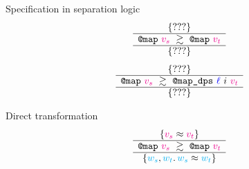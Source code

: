 \begin{frame}{Specification in separation logic}
\LARGE
\[
    \iSimvHoarePretty{
        ???
    }{
        \datalangCall{\datalangFnptr{\texttt{map}}}{\mathcolor{magenta}{\datalangVal_s}}
    }{
        \datalangCall{\datalangFnptr{\texttt{map}}}{\mathcolor{magenta}{\datalangVal_t}}
    }{
        ???
    }
\]
\vfill
\[
    \iSimvHoarePretty{
        ???
    }{
        \datalangCall{\datalangFnptr{\texttt{map}}}{\mathcolor{magenta}{\datalangVal_s}}
    }{
        \datalangCall{\datalangFnptr{\texttt{map\_dps}}}{\mathcolor{blue}{\datalangLoc}\ \datalangIdx\ \mathcolor{magenta}{\datalangVal_t}}
    }{
        ???
    }
\]
\end{frame}

\begin{frame}{Direct transformation}
\Large
\[
    \iSimvHoarePretty{
        \mathcolor{magenta}{\datalangVal_s} \iSimilar \mathcolor{magenta}{\datalangVal_t}
    }{
        \datalangCall{\datalangFnptr{\texttt{map}}}{\mathcolor{magenta}{\datalangVal_s}}
    }{
        \datalangCall{\datalangFnptr{\texttt{map}}}{\mathcolor{magenta}{\datalangVal_t}}
    }{
        \mathcolor{cyan}{\datalangValTwo_s}, \mathcolor{cyan}{\datalangValTwo_t} \ldotp
        \mathcolor{cyan}{\datalangValTwo_s} \iSimilar \mathcolor{cyan}{\datalangValTwo_t}
    }
\]
\vfill
\begin{mathpar}
\end{mathpar}
\end{frame}

